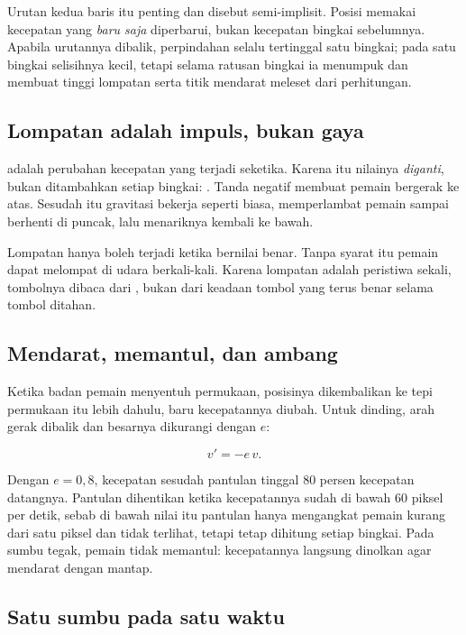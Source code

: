 Urutan kedua baris itu penting dan disebut 
semi-implisit. Posisi memakai kecepatan yang \emph{baru saja} diperbarui,
bukan kecepatan bingkai sebelumnya. Apabila urutannya dibalik, perpindahan
selalu tertinggal satu bingkai; pada satu bingkai selisihnya kecil, tetapi
selama ratusan bingkai ia menumpuk dan membuat tinggi lompatan serta titik
mendarat meleset dari perhitungan.

\subsection*{Lompatan adalah impuls, bukan gaya}

 adalah perubahan kecepatan yang terjadi seketika.
Karena itu nilainya \emph{diganti}, bukan ditambahkan setiap bingkai:
. Tanda negatif membuat pemain bergerak ke
atas. Sesudah itu gravitasi bekerja seperti biasa, memperlambat pemain sampai
berhenti di puncak, lalu menariknya kembali ke bawah.

Lompatan hanya boleh terjadi ketika  bernilai benar. Tanpa
syarat itu pemain dapat melompat di udara berkali-kali. Karena lompatan adalah
peristiwa sekali, tombolnya dibaca dari , bukan dari keadaan
tombol yang terus benar selama tombol ditahan.

\subsection*{Mendarat, memantul, dan ambang}

Ketika badan pemain menyentuh permukaan, posisinya dikembalikan ke tepi
permukaan itu lebih dahulu, baru kecepatannya diubah. Untuk dinding, arah
gerak dibalik dan besarnya dikurangi dengan  $e$:

\[
v' = -e\,v .
\]

Dengan $e = 0{,}8$, kecepatan sesudah pantulan tinggal 80 persen kecepatan
datangnya. Pantulan dihentikan ketika kecepatannya sudah di bawah 60 piksel
per detik, sebab di bawah nilai itu pantulan hanya mengangkat pemain kurang
dari satu piksel dan tidak terlihat, tetapi tetap dihitung setiap bingkai.
Pada sumbu tegak, pemain tidak memantul: kecepatannya langsung dinolkan agar
mendarat dengan mantap.

\subsection*{Satu sumbu pada satu waktu}

